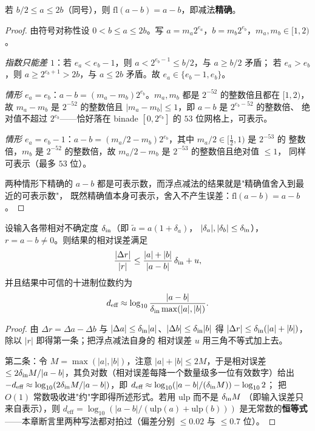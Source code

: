 \begin{theorem}[Sterbenz 引理]
\label{thm:sterbenz}
若 $b/2\le a\le 2b$（同号），则 $\mathrm{fl}(a-b)=a-b$，即减法\textbf{精确}。
\end{theorem}

\begin{proof}
由符号对称性设 $0<b\le a\le 2b$。写 $a=m_a2^{e_a}$，$b=m_b2^{e_b}$，$m_a,m_b\in[1,2)$。

\emph{指数只能差 $1$}：若 $e_a<e_b-1$，则 $a<2^{e_b-1}\le b/2$，与 $a\ge b/2$ 矛盾；
若 $e_a>e_b$，则 $a\ge2^{e_b+1}>2b$，与 $a\le2b$ 矛盾。故 $e_a\in\{e_b-1,e_b\}$。

\emph{情形 $e_a=e_b$}：$a-b=(m_a-m_b)2^{e_b}$。$m_a,m_b$ 都是 $2^{-52}$ 的整数倍且都在 $[1,2)$，
故 $m_a-m_b$ 是 $2^{-52}$ 的整数倍且 $|m_a-m_b|\le1$，即 $a-b$ 是 $2^{e_b-52}$ 的整数倍、
绝对值不超过 $2^{e_b}$——恰好落在 binade $[0,2^{e_b}]$ 的 $53$ 位网格上，可表示。

\emph{情形 $e_a=e_b-1$}：$a-b=(m_a/2-m_b)2^{e_b}$，其中 $m_a/2\in[\tfrac12,1)$ 是 $2^{-53}$ 的
整数倍，$m_b$ 是 $2^{-52}$ 的整数倍，故 $m_a/2-m_b$ 是 $2^{-53}$ 的整数倍且绝对值 $\le1$，
同样可表示（最多 $53$ 位）。

两种情形下精确的 $a-b$ 都是可表示数，而浮点减法的结果就是"精确值舍入到最近的可表示数"，
既然精确值本身可表示，舍入不产生误差：$\mathrm{fl}(a-b)=a-b$。
\end{proof}

\begin{theorem}[减法的条件数与有效位损失]
\label{thm:cancellation}
设输入各带相对不确定度 $\delta_{\rm in}$（即 $\tilde a=a(1+\delta_a)$，
$|\delta_a|,|\delta_b|\le\delta_{\rm in}$），$r=a-b\ne0$。则结果的相对误差满足
\[
  \frac{|\Delta r|}{|r|}\le\frac{|a|+|b|}{|a-b|}\,\delta_{\rm in}+u ,
\]
并且结果中可信的十进制位数约为
\[
  d_{\text{eff}}\approx\log_{10}\frac{|a-b|}{\delta_{\rm in}\max(|a|,|b|)} .
\]
\end{theorem}

\begin{proof}
由 $\Delta r=\Delta a-\Delta b$ 与 $|\Delta a|\le\delta_{\rm in}|a|$、$|\Delta b|\le\delta_{\rm in}|b|$
得 $|\Delta r|\le\delta_{\rm in}(|a|+|b|)$，除以 $|r|$ 即得第一条；把浮点减法自身的
相对误差 $u$ 用三角不等式加上去。

第二条：令 $M=\max(|a|,|b|)$，注意 $|a|+|b|\le2M$，于是相对误差
$\le2\delta_{\rm in}M/|a-b|$，其负对数（相对误差每降一个数量级多一位有效数字）给出
$-d_{\text{eff}}\approx\log_{10}(2\delta_{\rm in}M/|a-b|)$，即
$d_{\text{eff}}\approx\log_{10}(|a-b|/(\delta_{\rm in}M))-\log_{10}2$；
把 $O(1)$ 常数吸收进"约"字即得所述形式。若用 $\mathrm{ulp}$ 而不是 $\delta_{\rm in}M$
（即输入误差只来自表示），则 $d_{\text{eff}}=\log_{10}(|a-b|/(\mathrm{ulp}(a)+\mathrm{ulp}(b)))$
是无常数的\textbf{恒等式}——本章断言里两种写法都对拍过（偏差分别 $\le0.02$ 与 $\le0.7$ 位）。
\end{proof}

